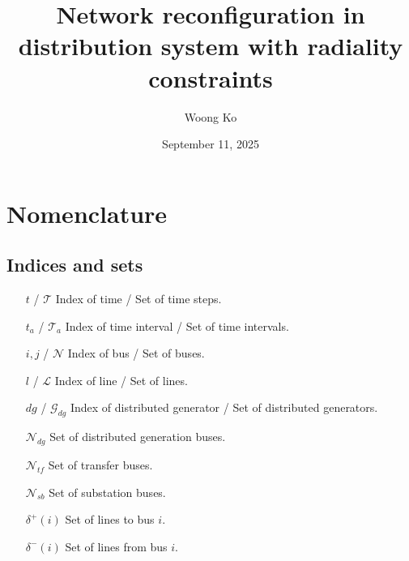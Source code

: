 \documentclass{article}
\title{Network reconfiguration in distribution system with radiality constraints}
\author{Woong Ko}
\date{September 11, 2025}
\begin{document}
\maketitle

\section*{Nomenclature}
\subsection*{Indices and sets}
\begin{itemize}
\item[$t$ / $\mathcal{T}$] Index of time / Set of time steps.
\item[$t_{a}$ / $\mathcal{T}_{a}$] Index of time interval / Set of time intervals.
\item[$i, j$ / $\mathcal{N}$] Index of bus / Set of buses.
\item[$l$ / $\mathcal{L}$] Index of line / Set of lines.
\item[$dg$ / $\mathcal{G}_{dg}$] Index of distributed generator / Set of distributed generators.
\item[$\mathcal{N}_{dg}$] Set of distributed generation buses.
\item[$\mathcal{N}_{tf}$] Set of transfer buses.
\item[$\mathcal{N}_{sb}$] Set of substation buses.
\item[$\delta^{+}(i) $] Set of lines to bus $i$. 
\item[$\delta^{-}(i) $] Set of lines from bus $i$. 
\end{itemize}
\end{document}
